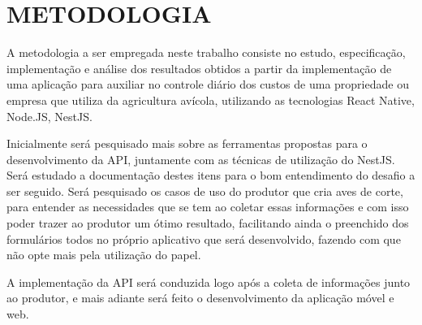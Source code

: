 
\chapter{METODOLOGIA}
\label{chap:metodologia}

A metodologia a ser empregada neste trabalho consiste no estudo, especificação, implementação e análise dos resultados obtidos a partir da implementação de uma aplicação para auxiliar no controle diário dos custos de uma propriedade ou empresa que utiliza da agricultura avícola, utilizando as tecnologias React Native, Node.JS, NestJS.



Inicialmente será pesquisado mais sobre as ferramentas propostas para o desenvolvimento da API, juntamente com as técnicas de utilização do NestJS. Será estudado a documentação destes itens para o bom entendimento do desafio a ser seguido. Será pesquisado os casos de uso do produtor que cria aves de corte, para entender as necessidades que se tem ao coletar essas informações e com isso poder trazer ao produtor um ótimo resultado, facilitando ainda o preenchido dos formulários todos no próprio aplicativo que será desenvolvido, fazendo com que não opte mais pela utilização do papel. 

A implementação da API será conduzida logo após a coleta de informações junto ao produtor, e mais adiante será feito o desenvolvimento da aplicação móvel e web.

